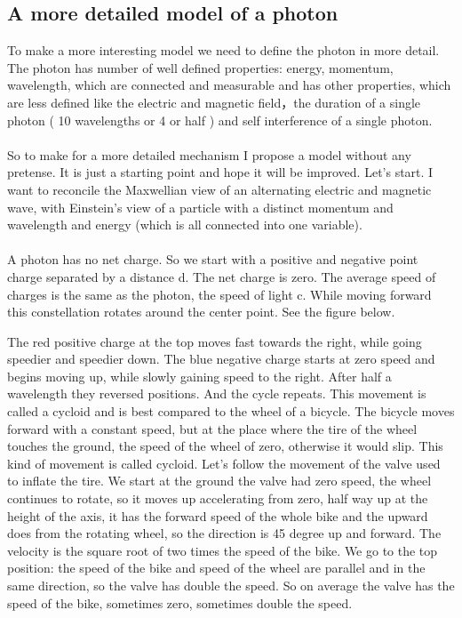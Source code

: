 \subsection{A more detailed model of a photon}
To make a more interesting model we need to define the photon in more detail. The photon has number of well defined properties: energy, momentum, wavelength, which are connected and measurable and has other properties, which are less defined like the electric and magnetic field，the duration of a single photon ( 10 wavelengths or 4 or half ) and self interference of a single photon.
\paragraph{}
So to make for a more detailed mechanism I propose a model without any pretense. It is just a starting point and hope it will be improved. Let's start. 
I want to reconcile the Maxwellian view of an alternating electric and magnetic wave, with Einstein's view of a particle with a distinct momentum and wavelength and energy (which is all connected into one variable). 
\paragraph{}
A photon has no net charge. So we start with a positive and negative point charge separated by a distance d. The net charge is zero. The average speed of charges is the same as the photon, the speed of light c. While moving forward this constellation rotates around the center point. See the figure below.

The red positive charge at the top moves fast towards the right, while going speedier and speedier down. The blue negative charge starts at zero speed and begins moving up, while slowly gaining speed to the right. After half a wavelength they reversed positions. And the cycle repeats.
This movement is called a cycloid and is best compared to the wheel of a bicycle. The bicycle moves forward with a constant speed, but at the place where the tire of the wheel touches the ground, the speed of the wheel of zero, otherwise it would slip. This kind of movement is called cycloid.
Let's follow the movement of the valve used to inflate the tire.
We start at the ground the valve had zero speed, the wheel continues to rotate, so it moves up accelerating from zero, half way up at the height of the axis, it has the forward speed of the whole bike and the upward does from the rotating wheel, so the direction is 45 degree up and forward. The velocity is the square root of two times the speed of the bike. We go to the top position: the speed of the bike and speed of the wheel are parallel and in the same direction, so the valve has double the speed.
So on average the valve has the speed of the bike, sometimes zero, sometimes double the speed.

